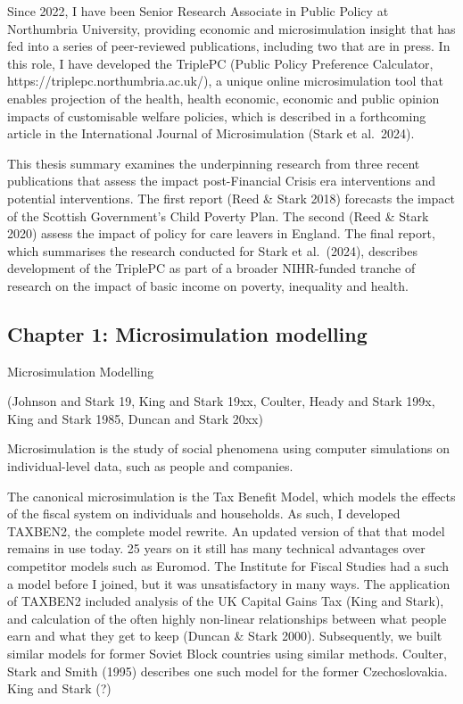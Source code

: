 \documentclass[
  letterpaper,
  DIV=11,
  numbers=noendperiod]{scrartcl}
\begin{document}
Since 2022, I have been Senior Research Associate in Public Policy at
Northumbria University, providing economic and microsimulation insight
that has fed into a series of peer-reviewed publications, including two
that are in press. In this role, I have developed the TriplePC (Public
Policy Preference Calculator, https://triplepc.northumbria.ac.uk/), a
unique online microsimulation tool that enables projection of the
health, health economic, economic and public opinion impacts of
customisable welfare policies, which is described in a forthcoming
article in the International Journal of Microsimulation (Stark et
al.~2024).

This thesis summary examines the underpinning research from three recent
publications that assess the impact post-Financial Crisis era
interventions and potential interventions. The first report (Reed \&
Stark 2018) forecasts the impact of the Scottish Government's Child
Poverty Plan. The second (Reed \& Stark 2020) assess the impact of
policy for care leavers in England. The final report, which summarises
the research conducted for Stark et al.~(2024), describes development of
the TriplePC as part of a broader NIHR-funded tranche of research on the
impact of basic income on poverty, inequality and health.

\subsection{Chapter 1: Microsimulation
modelling}\label{chapter-1-microsimulation-modelling}

Microsimulation Modelling

(Johnson and Stark 19, King and Stark 19xx, Coulter, Heady and Stark
199x, King and Stark 1985, Duncan and Stark 20xx)

Microsimulation is the study of social phenomena using computer
simulations on individual-level data, such as people and companies.

The canonical microsimulation is the Tax Benefit Model, which models the
effects of the fiscal system on individuals and households. As such, I
developed TAXBEN2, the complete model rewrite. An updated version of
that that model remains in use today. 25 years on it still has many
technical advantages over competitor models such as Euromod. The
Institute for Fiscal Studies had a such a model before I joined, but it
was unsatisfactory in many ways. The application of TAXBEN2 included
analysis of the UK Capital Gains Tax (King and Stark), and calculation
of the often highly non-linear relationships between what people earn
and what they get to keep (Duncan \& Stark 2000). Subsequently, we built
similar models for former Soviet Block countries using similar methods.
Coulter, Stark and Smith (1995) describes one such model for the former
Czechoslovakia. King and Stark (?)
\end{document}
